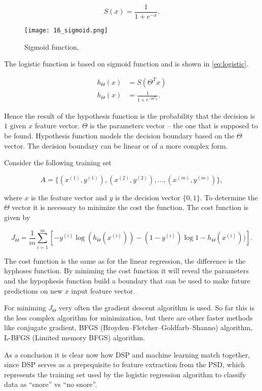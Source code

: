 \begin{equation}\label{eq:sigmoid}
 S(x) = \frac{1}{1 + e^{-x}}.
\end{equation}

\begin{figure}[!ht]
\centering
  \texttt{[image: 16\_sigmoid.png]}
\caption{Sigmoid function, \cite{sigmoid}}
\label{fig:sigmoid}
\end{figure}

The logistic function is based on sigmoid function and is shown in \eqref{eq:logistic}.

\begin{equation}\label{eq:logistic}
\begin{split}
 h_{\Theta}(x) &= S(\Theta^T x) \\
 h_{\Theta}(x) &= \frac{1}{1 + e^{-\Theta^T x}}.
\end{split}
\end{equation}

Hence the result of the hypothesis function is the probability that the decision is $1$ given $x$ feature vector. $\Theta$ is the parameters vector -- the one that is supposed to be found. Hypothesis function models the decision boundary based on the $\Theta$ vector. The decision boundary can be linear or of a more complex form.

Consider the following training set

\begin{equation}\label{eq:sigmoid}
 A = \{(x^{(1)}, y^{(1)}), (x^{(2)}, y^{(2)}), \ldots , (x^{(m)}, y^{(m)})\},
\end{equation}

\noindent
where $x$ is the feature vector and $y$ is the decision vector $\{0, 1\}$. To determine the $\Theta$ vector it is necessary to minimize the cost the function. The cost function is given by

\begin{equation}\label{eq:sigmoid}
 J_{\Theta} =\frac{1}{m} \sum_{i = 1}^{m} [-y^{(i)} \log{(h_{\Theta}(x^{(i)})) - (1 - y^{(i)}) \log{1 - h_{\Theta}(x^{(i)}))}}].
\end{equation}

The cost function is the same as for the linear regression, the difference is the hyphoses function. By miniming the cost function it will reveal the parameters and the hypophesis function build a boundary that can be used to make future predictions on new $x$ input feature vector. 

For miniming $J_{\Theta}$ very often the gradient descent algorithm is used. So far this is the less complex algorithm for minimization, but there are other faster methods like conjugate gradient, BFGS (Broyden–Fletcher–Goldfarb–Shanno) algorithm, L-BFGS (Limited memory BFGS) algorithm.

As a conclusion it is clear now how DSP and machine learning match together, since DSP serves as a prepequisite to feature extraction from the PSD, which represents the training set used by the logistic regression algorithm to classify data as ``snore'' vs ``no snore''.

\clearpage


